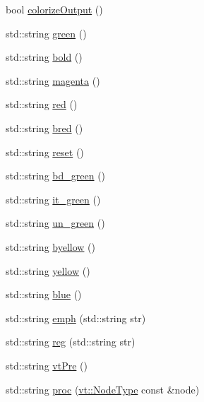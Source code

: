 \begin{DoxyCompactItemize}
\item 
bool \hyperlink{namespacevt_1_1debug_adf5702c2e0469340d30ee8882848f304}{colorize\+Output} ()
\item 
std\+::string \hyperlink{namespacevt_1_1debug_ac88d2f3171c5f622861b5c8ea986f281}{green} ()
\item 
std\+::string \hyperlink{namespacevt_1_1debug_a7a1e7bc4a250917d20840a4d48e27388}{bold} ()
\item 
std\+::string \hyperlink{namespacevt_1_1debug_a1617ac1c602fb27518f6ab8fd4bf99c1}{magenta} ()
\item 
std\+::string \hyperlink{namespacevt_1_1debug_a6b162f2ca1d964d7cf05c4079d5554a0}{red} ()
\item 
std\+::string \hyperlink{namespacevt_1_1debug_ae03a761958b929eaa82f356059f71a46}{bred} ()
\item 
std\+::string \hyperlink{namespacevt_1_1debug_a4456c051bd468fe024334f24887867af}{reset} ()
\item 
std\+::string \hyperlink{namespacevt_1_1debug_a26f95b8d5da98fa54a335789b18fb3d3}{bd\+\_\+green} ()
\item 
std\+::string \hyperlink{namespacevt_1_1debug_a749c31dee324cac600ec442f9f39eb7c}{it\+\_\+green} ()
\item 
std\+::string \hyperlink{namespacevt_1_1debug_aa449a2c29c030d8cd267fd19c0511d5c}{un\+\_\+green} ()
\item 
std\+::string \hyperlink{namespacevt_1_1debug_afb3aac4faf63d7f2aac0d6d142d0b599}{byellow} ()
\item 
std\+::string \hyperlink{namespacevt_1_1debug_ad85c9e5ee0f986151a01212647d2b60d}{yellow} ()
\item 
std\+::string \hyperlink{namespacevt_1_1debug_a26b73aa7586b78f4c148b26e5414ebe1}{blue} ()
\item 
std\+::string \hyperlink{namespacevt_1_1debug_add365336d7aa2053b5b7588ccad48ac7}{emph} (std\+::string str)
\item 
std\+::string \hyperlink{namespacevt_1_1debug_a394711b7d26f45a51bf46c86032742f1}{reg} (std\+::string str)
\item 
std\+::string \hyperlink{namespacevt_1_1debug_acfaac527e91984bde40775eb9b4372ef}{vt\+Pre} ()
\item 
std\+::string \hyperlink{namespacevt_1_1debug_a13a11e278ff8e5a4093396437511aeb7}{proc} (\hyperlink{namespacevt_a866da9d0efc19c0a1ce79e9e492f47e2}{vt\+::\+Node\+Type} const \&node)
\item 

\end{DoxyCompactItemize}
